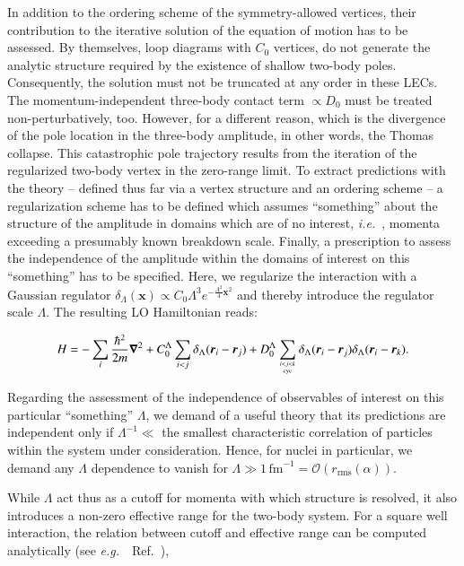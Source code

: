 \documentclass[preprint,12pt]{elsarticle}
\newcommand{\fm}{\ensuremath{\,\text{fm}^{-1}}}
\newcommand{\eg}{\textit{e.g.}~}
\newcommand{\ie}{\textit{i.e.}~}
\newcommand{\ve}[1]{\ensuremath{\boldsymbol{#1}}}
\begin{document}
In addition to the ordering scheme of the symmetry-allowed vertices, their contribution to the iterative solution of
the equation of motion has to be assessed.
By themselves, loop diagrams with $C_0$ vertices, do not generate the analytic structure required by the existence
of shallow two-body poles. Consequently, the solution must not be truncated at any order in these LECs.
The momentum-independent three-body contact term $\propto D_0$ must be treated non-perturbatively\cite{Bedaque:1998kg},
too. However, for a different reason, which is the divergence of the pole location in the three-body amplitude, in other
words, the Thomas collapse. This catastrophic pole trajectory results from the iteration of the regularized two-body
vertex in the zero-range limit.
To extract predictions with the theory -- defined thus far via a vertex structure and an ordering scheme -- a
regularization scheme has to be defined which assumes ``something'' about the structure of the amplitude in domains
which are of no interest, \ie, momenta exceeding a presumably known breakdown scale. Finally, a prescription to
assess the independence of the amplitude within the domains of interest on this ``something'' has to be
specified. 
Here, we regularize the interaction with a Gaussian regulator 
\mbox{$\delta_\Lambda(\ve{x}) \propto C_0\Lambda^3 e^{-\frac{\Lambda^2}{4}\ve{x}^2}$}
and thereby introduce the regulator scale $\Lambda$. The resulting LO Hamiltonian reads:

\begin{equation}
H = - \sum_i \frac{\hbar^2}{2m}\ve{\nabla}^2+ C_0^\Lambda \sum_{i<j}{\delta_\Lambda(\ve{r}_i-\ve{r}_j)} 
+ D_0^\Lambda \sum_{ i<j<k \atop \text{cyc} }\delta_\Lambda(\ve{r}_i-\ve{r}_j)\delta_\Lambda(\ve{r}_i-\ve{r}_k).
\label{eq:hamiltonian}
\end{equation}

Regarding the assessment of the independence of observables of interest on this particular ``something'' $\Lambda$,
we demand of a useful theory that its predictions are independent only if $\Lambda^{-1}\ll$ the smallest characteristic
correlation of particles within the system under consideration. Hence, for nuclei in particular, we demand
any $\Lambda$ dependence to vanish for $\Lambda\gg 1\fm=\mathcal{O}(r_\text{rms}(\alpha))$.

While $\Lambda$ act thus as a cutoff for momenta with which structure is resolved,
it also introduces a non-zero effective range for the two-body system.
For a square well interaction, the relation between cutoff and effective range can be computed analytically 
(see \eg~Ref.~\cite{Phillips}),
\end{document}
